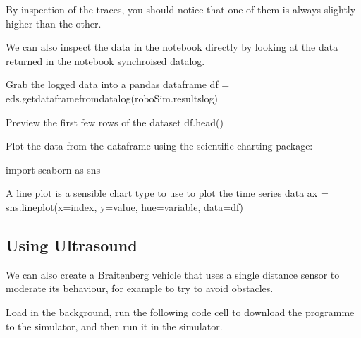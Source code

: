 \documentclass[letterpaper,10pt,english]{sphinxmanual}
\begin{document}
By inspection of the traces, you should notice that one of them is always slightly higher than the other.

We can also inspect the data in the notebook directly by looking at the data returned in the notebook synchroised datalog.

{
\begin{sphinxVerbatim}[commandchars=\\\{\}]
\llap{\color{nbsphinxin}[ ]:\,\hspace{\fboxrule}\hspace{\fboxsep}}\PYGZsh{}Grab the logged data into a pandas dataframe
df = eds.get\PYGZus{}dataframe\PYGZus{}from\PYGZus{}datalog(roboSim.results\PYGZus{}log)

\PYGZsh{}Preview the first few rows of the dataset
df.head()
\end{sphinxVerbatim}
}

Plot the data from the dataframe using the  scientific charting package:

{
\begin{sphinxVerbatim}[commandchars=\\\{\}]
\llap{\color{nbsphinxin}[ ]:\,\hspace{\fboxrule}\hspace{\fboxsep}}import seaborn as sns

\PYGZsh{} A line plot is a sensible chart type to use
\PYGZsh{} to plot the time series data
ax = sns.lineplot(x=\PYGZdq{}index\PYGZdq{},
                  y=\PYGZdq{}value\PYGZdq{},
                  hue=\PYGZsq{}variable\PYGZsq{},
                  data=df)
\end{sphinxVerbatim}
}


\subsection{Using Ultrasound}
\label{\detokenize{content/03_Robot_Lab/Section_00_03:Using-Ultrasound}}
We can also create a Braitenberg vehicle that uses a single distance sensor to moderate its behaviour, for example to try to avoid obstacles.

Load in the  background, run the following code cell to download the programme to the simulator, and then run it in the simulator.
\end{document}
